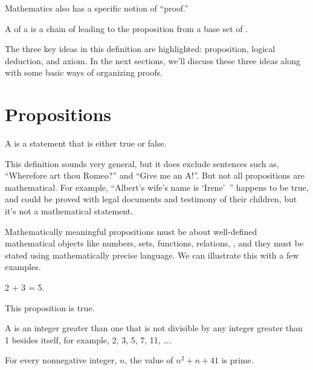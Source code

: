 Mathematics also has a specific notion of ``proof.''

\begin{definition*}
A  of a  is a chain of  leading to the proposition from a base set of .
\end{definition*}

The three key ideas in this definition are highlighted: proposition,
logical deduction, and axiom.  In the next sections, we'll discuss these
three ideas along with some basic ways of organizing proofs.

\iffalse The last section contains some examples of complete proofs.\fi

\begin{problems}
\classproblems
{}
\end{problems}

\section{Propositions}

\begin{definition*}
  A  is a statement that is either true or false.
\end{definition*}

This definition sounds very general, but it does exclude sentences
such as, ``Wherefore art thou Romeo?'' and ``Give me an A!''.
But not all propositions are mathematical.  For example, ``Albert's wife's
name is `Irene'~'' happens to be true, and could be proved with legal
documents and testimony of their children, but it's not a mathematical
statement.

Mathematically meaningful propositions must be about well-defined
mathematical objects like numbers, sets, functions, relations, \etc, and
they must be stated using mathematically precise language.  We can
illustrate this with a few examples.

\begin{proposition}
2 + 3 = 5.
\end{proposition}
%
This proposition is true.

A  is an integer greater than one that is not divisible by
any integer greater than 1 besides itself, for example, 2, 3, 5, 7,
11, \dots.
\begin{proposition}\label{41form}
For every nonnegative integer, $n$, the value of $n^2 + n + 41$ is prime.
\end{proposition}

